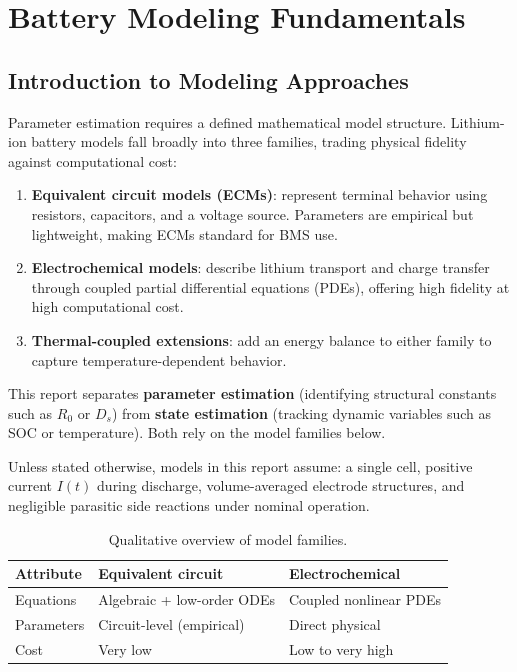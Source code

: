 \chapter{Battery Modeling Fundamentals}
\label{chap:modeling}

\section{Introduction to Modeling Approaches}
\label{sec:intro_modeling}

Parameter estimation requires a defined mathematical model structure. Lithium-ion battery models fall broadly into three families, trading physical fidelity against computational cost:

\begin{enumerate}
    \item \textbf{Equivalent circuit models (ECMs)}: represent terminal behavior using resistors, capacitors, and a voltage source. Parameters are empirical but lightweight, making ECMs standard for BMS use.
    \item \textbf{Electrochemical models}: describe lithium transport and charge transfer through coupled partial differential equations (PDEs), offering high fidelity at high computational cost.
    \item \textbf{Thermal-coupled extensions}: add an energy balance to either family to capture temperature-dependent behavior.
\end{enumerate}

This report separates \textbf{parameter estimation} (identifying structural constants such as $R_0$ or $D_s$) from \textbf{state estimation} (tracking dynamic variables such as SOC or temperature). Both rely on the model families below.

Unless stated otherwise, models in this report assume: a single cell, positive current $I(t)$ during discharge, volume-averaged electrode structures, and negligible parasitic side reactions under nominal operation.

\begin{table}[htbp]
\centering
\caption{Qualitative overview of model families.}
\label{tab:model_family_overview}
\footnotesize
\begin{tabularx}{\textwidth}{
    >{\raggedright\arraybackslash}p{2.6cm}
    >{\raggedright\arraybackslash}X
    >{\raggedright\arraybackslash}X
}
\toprule
\textbf{Attribute} & \textbf{Equivalent circuit} & \textbf{Electrochemical} \\
\midrule
Equations & Algebraic + low-order ODEs & Coupled nonlinear PDEs \\
Parameters & Circuit-level (empirical) & Direct physical \\
Cost & Very low & Low to very high \\
\bottomrule
\end{tabularx}
\end{table}

